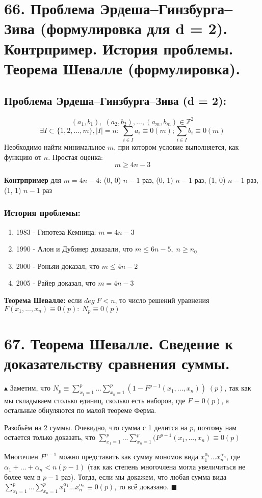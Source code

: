 \section*{66. Проблема Эрдеша–Гинзбурга–Зива (формулировка для d = 2). Контрпример. История проблемы. Теорема Шевалле (формулировка).}
\subsection*{Проблема Эрдеша–Гинзбурга–Зива (d = 2):}
$$(a_1, b_1), \; (a_2, b_2), ..., (a_m, b_m) \in \mathbb{Z}^2$$
$$\exists I \subset \{ 1, 2, ..., m\}, |I|=n: \; \sum_{i \in I}a_i \equiv 0(m); \sum_{i \in I}b_i \equiv 0(m)$$
Необходимо найти минимальное $m$, при котором условие выполняется, как функцию от $n$. Простая оценка:
$$m \geq 4n-3$$
\par \textbf{Контрпример} для $m=4n-4$: (0, 0) $n-1$ раз, (0, 1) $n-1$ раз, (1, 0) $n-1$ раз, (1, 1) $n-1$ раз 
\subsubsection*{История проблемы:}
\begin{enumerate}
    \item 1983 - Гипотеза Кемница: $m=4n-3$
    \item 1990 - Алон и Дубинер доказали, что $m \leq 6n-5, \; n \geq n_0$
    \item 2000 - Роньяи доказал, что $m \leq 4n-2$
    \item 2005 - Райер доказал, что $m=4n-3$
\end{enumerate}
\par \textbf{Теорема Шевалле:} если $deg \; F < n$, то число решений уравнения $F(x_1, ..., x_n) \equiv 0 (p): \; N_p \equiv 0(p)$

\section*{67. Теорема Шевалле. Сведение к доказательству сравнения суммы.}
\par $\blacktriangle$ Заметим, что $N_p \equiv \sum_{x_1=1}^p...\sum_{x_n=1}^p(1-F^{p-1}(x_1, ..., x_n)) \; (p)$, так как мы складываем столько единиц, сколько есть наборов, где $F \equiv 0(p)$, а остальные обнуляются по малой теореме Ферма. 
\par Разобьём на 2 суммы. Очевидно, что сумма с 1 делится на $p$, поэтому нам остается только доказать, что $\sum\limits_{x_1=1}^p...\sum\limits_{x_n=1}^p(F^{p-1}(x_1, ..., x_n) \equiv 0 (p)$
\par Многочлен $F^{p-1}$ можно представить как сумму мономов вида $x_1^{\alpha_1}...x_n^{\alpha_n}$, где $\alpha_1 + ... + \alpha_n < n(p-1)$ (так как степень многочлена могла увеличиться не более чем в $p-1$ раз). Тогда, если мы докажем, что любая сумма вида $\sum\limits_{x_1=1}^p...\sum\limits_{x_n=1}^px_1^{\alpha_1}...x_n^{\alpha_n} \equiv 0 (p)$, то всё доказано. $\blacksquare$


